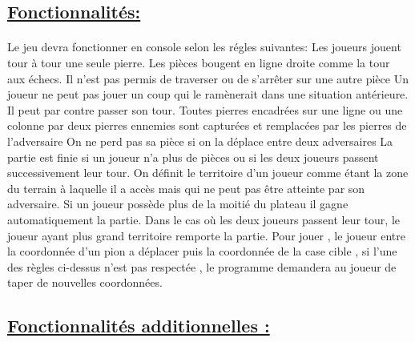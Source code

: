\documentclass[a4paper,12pt]{article}
\begin{document}
\subsection{\underline{Fonctionnalités:}}
\paragraph{}
Le jeu devra fonctionner en console selon les régles suivantes:
\newline
Les joueurs jouent tour à tour une seule pierre. Les pièces bougent en ligne droite comme
la tour aux échecs. Il n’est pas permis de traverser ou de s'arrêter sur une autre pièce
\newline
\newline
Un joueur ne peut pas jouer un coup qui le ramènerait dans une situation antérieure.
Il peut par contre passer son tour.
\newline
\newline
Toutes pierres encadrées sur une ligne ou une colonne par deux pierres ennemies sont
capturées et remplacées par les pierres de l'adversaire
\newline
On ne perd pas sa pièce si on la déplace entre deux adversaires 
\newline
\newline
La partie est finie si un joueur n’a plus de pièces ou si les deux joueurs passent successivement
leur tour.
\newline
\newline
On définit le territoire d’un joueur comme étant la zone du terrain à laquelle il a accès
mais qui ne peut pas être atteinte par son adversaire. Si un joueur possède plus de la
moitié du plateau il gagne automatiquement la partie.
\newline
Dans le cas où les deux joueurs passent leur tour, le joueur ayant plus grand territoire
remporte la partie.
\newline
\newline
Pour jouer , le joueur entre la coordonnée d'un pion a déplacer puis la coordonnée de la case cible , si l'une des règles ci-dessus n'est pas respectée , le programme demandera au joueur de taper de nouvelles coordonnées.

\subsection{\underline{Fonctionnalités additionnelles :}}
\end{document}
